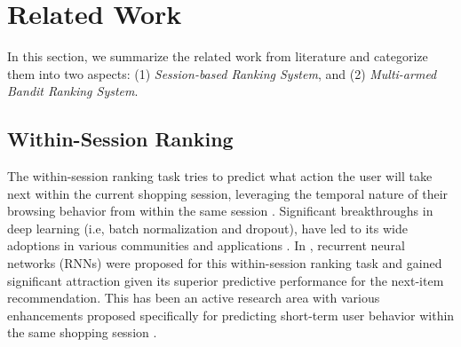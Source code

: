 \documentclass[11pt, dvipdfmx]{article}
\begin{document}
\section{Related Work}\label{sec:related_works}
In this section, we summarize the related work from literature and categorize them into two aspects: (1) \textit{Session-based Ranking System}, and (2) \textit{Multi-armed Bandit Ranking System}.
\subsection{Within-Session Ranking}
The within-session ranking task tries to predict what action the user will take next within the current shopping session, leveraging the temporal nature of their browsing behavior from within the same session \cite{KDD18_JD_nextItemRecs, SIGIR16_RNN_nextBasketRec}. Significant breakthroughs in deep learning (i.e, batch normalization and dropout), have led to its wide adoptions in various communities and applications \cite{2019_DNN_rec_survey}. In \cite{Hidasi2016SessionbasedRW}, recurrent neural networks (RNNs) were proposed for this within-session ranking task and gained significant attraction given its superior predictive performance for the next-item recommendation. This has been an active research area with various enhancements proposed specifically for predicting short-term user behavior within the same shopping session \cite{Hidasi2016SessionbasedRW, IJCAI17_sessionContextRecsys,recsys17_sessionRec_perso,DLRS16_sessionBasedRecsys,SIGIR16_RNN_nextBasketRec}.  
\end{document}

